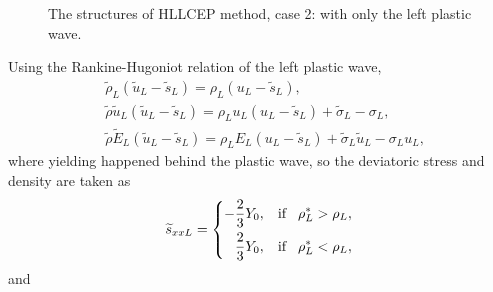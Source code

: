 \documentclass{article}
\numberwithin{equation}{section}
\numberwithin{table}{section}
\begin{document}
 \begin{figure}
   \centering
\begin{tikzpicture}
\end{tikzpicture}
\caption{The  structures of HLLCEP method, case 2: with only  the left plastic wave.}
\label{fig:case2}
\end{figure}
 Using the Rankine-Hugoniot relation of  the left  plastic wave,
  \begin{align}
	&\widetilde{\rho}_L(\widetilde{u}_L-\widetilde{s}_L) = \rho_L(u_L-\widetilde{s}_L), \label{eq:RHp1}\\
	&\widetilde{\rho}\widetilde{u}_L(\widetilde{u}_L-\widetilde{s}_L) = \rho_Lu_L(u_L-\widetilde{s}_L)+\widetilde{\sigma}_L-\sigma_L,  \label{eq:RHp2}\\
	&\widetilde{\rho}\widetilde{E}_L(\widetilde{u}_L-\widetilde{s}_L) = \rho_LE_L(u_L-\widetilde{s}_L)+\widetilde{\sigma}_L \widetilde{u}_L-\sigma_Lu_L, \label{eq:RHp3}
\end{align}
where yielding happened behind the plastic wave, so the deviatoric stress and density are taken as
\begin{equation}
  \widetilde{s}_{xxL} =\left\{ \begin{aligned}
	  -\frac{2}{3}Y_0, \hspace{0.3cm} \text{if} \hspace{0.3cm} \rho_L^* > \rho_L,\\
	  \frac{2}{3}Y_0, \hspace{0.3cm} \text{if} \hspace{0.3cm} \rho_L^* < \rho_L,\\
	\end{aligned}\right.
  \end{equation}
  and
\end{document}
